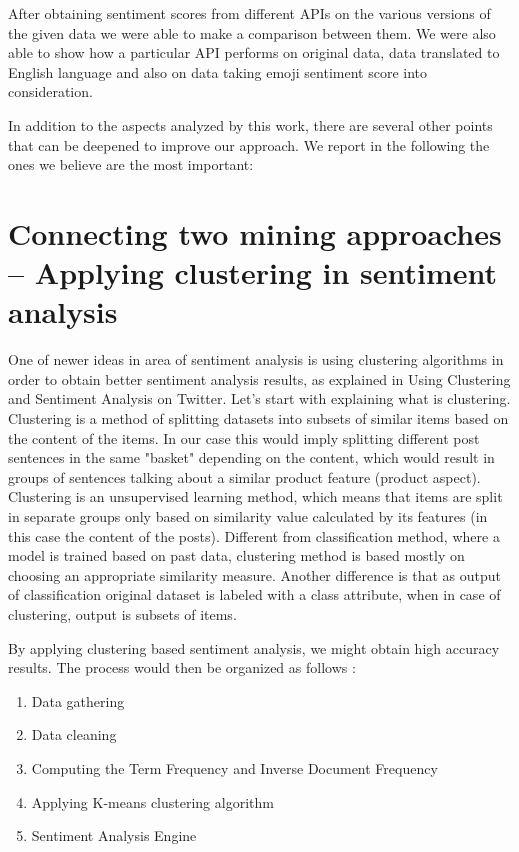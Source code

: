 After obtaining sentiment scores from different APIs on the various versions of the given data we were able to make a comparison between them. We were also able to show how a particular API performs on original data, data translated to English language and also on data taking emoji sentiment score into consideration.

In addition to the aspects analyzed by this work, there are several other points that can be deepened to improve our approach. We report in the following the ones we believe are the most important:

\section{Connecting two mining approaches – Applying clustering in sentiment analysis}

One of newer ideas in area of sentiment analysis is using clustering algorithms in order to obtain better sentiment analysis results, as explained in Using Clustering and Sentiment Analysis on Twitter\cite{Clustering}. Let's start with explaining what is clustering. Clustering is a method of splitting datasets into subsets of similar items based on the content of the items. In our case this would imply splitting different post sentences in the same "basket" depending on the content, which would result in groups of sentences talking about a similar product feature (product aspect). 
Clustering is an unsupervised learning method, which means that items are split in separate groups only based on similarity value calculated by its features (in this case the content of the posts). Different from classification method, where a model is trained based on past data, clustering method is based mostly on choosing an appropriate similarity measure. Another difference is that as output of classification original dataset is labeled with a class attribute, when in case of clustering, output is subsets of items. 

By applying clustering based sentiment analysis, we might obtain high accuracy results. The process would then be organized as follows : 
\begin{enumerate}
	\item Data gathering
	\item Data cleaning
	\item Computing the Term Frequency and Inverse Document Frequency
	\item Applying K-means clustering algorithm
	\item Sentiment Analysis Engine
\end{enumerate}


